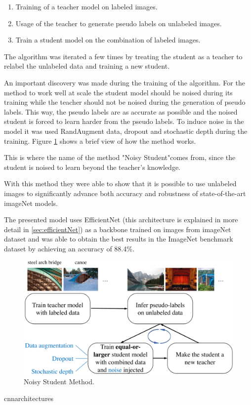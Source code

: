 \begin{enumerate}
    \item Training of a teacher model on labeled images.
    \item Usage of the teacher to generate pseudo labels on unlabeled images.
    \item Train a student model on the combination of labeled images.
\end{enumerate}

\par The algorithm was iterated a few times by treating the student as a teacher to relabel the unlabeled data and training a new student.

\par An important discovery was made during the training of the algorithm. For the method to work well at scale the student model should be noised during its training while the teacher should not be noised during the generation of pseudo labels. This way, the pseudo labels are as accurate as possible and the noised student is forced to learn harder from the pseudo labels. To induce noise in the model it was used RandAugment data, dropout and stochastic depth during the training. Figure \ref{fig:noisestudent} shows a brief view of how the method works.
\par This is where the name of the method "Noisy Student"comes from, since the student is noised to learn beyond the teacher's knowledge.
\par With this method they were able to show that it is possible to use unlabeled images to significantly advance both accuracy and robustness of state-of-the-art imageNet models.
\par The presented model uses EfficientNet (this architecture is explained in more detail in \ref{sec:efficientNet}) as a backbone trained on images from imageNet dataset and was able to obtain the best results in the ImageNet benchmark dataset by achieving an accuracy of 88.4\%.



\begin{figure}[htb]
    \centering
    \includegraphics[scale = 0.15]{Sections/2StateOfTheArt/2_images/noisy_student.png}
    \caption{Noisy Student Method. \cite{Xie2019}} 
    \label{fig:noisestudent}
\end{figure}cnnarchitectures

